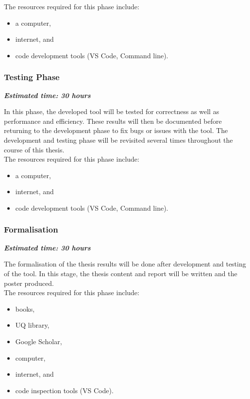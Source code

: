 \documentclass[twocolumn]{article}
\begin{document}
The resources required for this phase include:
\begin{itemize}
    \item a computer,
    \item internet, and
    \item code development tools (VS Code, Command line).
\end{itemize}

\subsubsection{Testing Phase}
\textbf{\textit{Estimated time: 30 hours}}

In this phase, the developed tool will be tested for correctness as well as performance and efficiency. These results will then be documented before returning to the development phase to fix bugs or issues with the tool. The development and testing phase will be revisited several times throughout the course of this thesis. \\

The resources required for this phase include:
\begin{itemize}
    \item a computer,
    \item internet, and
    \item code development tools (VS Code, Command line).
\end{itemize}

\subsubsection{Formalisation}
\textbf{\textit{Estimated time: 30 hours}}

The formalisation of the thesis results will be done after development and testing of the tool. In this stage, the thesis content and report will be written and the poster produced. \\

The resources required for this phase include:
\begin{itemize}
    \item books,
    \item UQ library,
    \item Google Scholar,
    \item computer,
    \item internet, and
    \item code inspection tools (VS Code).
\end{itemize}
\end{document}
